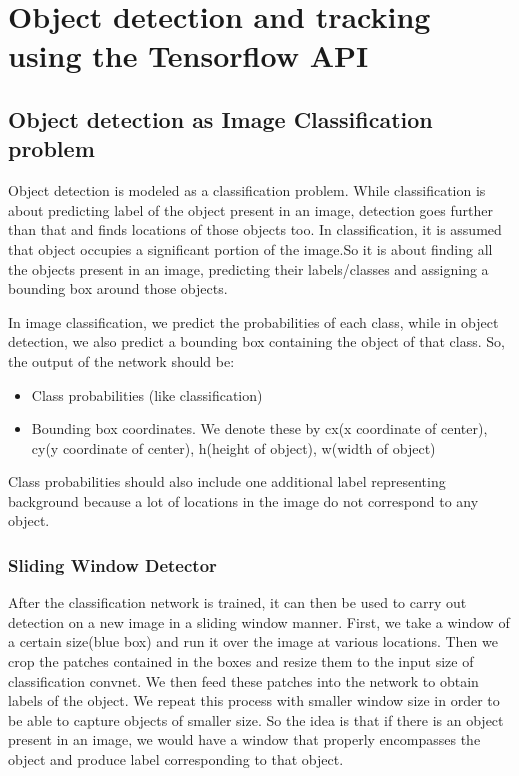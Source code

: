 \chapter{Object detection and tracking using the Tensorflow API}

	\section{Object detection as Image Classification problem}
	\label{Object detection as Image Classification problem}
		Object detection is modeled as a classification problem. While classification is about predicting label of the object present in an image, detection goes further than that and finds locations of those objects too. In classification, it is assumed that object occupies a significant portion of the image.So it is about finding all the objects present in an image, predicting their labels/classes and assigning a bounding box around those objects.~\cite{objssd}
		
		In image classification, we predict the probabilities of each class, while in object detection, we also predict a bounding box containing the object of that class. So, the output of the network should be:
		\begin{itemize}
			\item Class probabilities (like classification)
			\item Bounding box coordinates. We denote these by cx(x coordinate of center), cy(y coordinate of center), h(height of object), w(width of object)
		\end{itemize}
		Class probabilities should also include one additional label representing background because a lot of locations in the image do not correspond to any object.
	
	\subsection{Sliding Window Detector}
		After the classification network is trained, it can then be used to carry out detection on a new image in a sliding window manner. First, we take a window of a certain size(blue box) and run it over the image at various locations. Then we crop the patches contained in the boxes and resize them to the input size of classification convnet. We then feed these patches into the network to obtain labels of the object. We repeat this process with smaller window size in order to be able to capture objects of smaller size. So the idea is that if there is an object present in an image, we would have a window that properly encompasses the object and produce label corresponding to that object.
	
